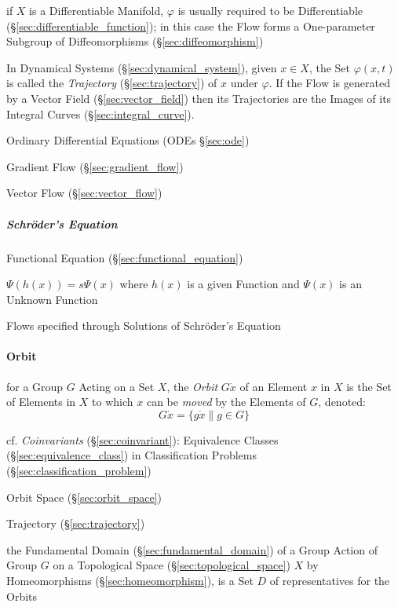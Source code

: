 if $X$ is a Differentiable Manifold, $\varphi$ is usually required to be
Differentiable (\S\ref{sec:differentiable_function}); in this case the Flow
forms a One-parameter Subgroup of Diffeomorphisms (\S\ref{sec:diffeomorphism})

In Dynamical Systems (\S\ref{sec:dynamical_system}), given $x \in X$, the Set
$\varphi(x,t)$ is called the \emph{Trajectory} (\S\ref{sec:trajectory}) of $x$
under $\varphi$. If the Flow is generated by a Vector Field
(\S\ref{sec:vector_field}) then its Trajectories are the Images of its Integral
Curves (\S\ref{sec:integral_curve}).

\fist Ordinary Differential Equations (ODEs \S\ref{sec:ode})

\fist Gradient Flow (\S\ref{sec:gradient_flow})

\fist Vector Flow (\S\ref{sec:vector_flow})



\subparagraph{Schr\"oder's Equation}\label{sec:schroders_equation}\hfill

Functional Equation (\S\ref{sec:functional_equation})

$\Psi(h(x)) = s\Psi(x)$ where $h(x)$ is a given Function and $\Psi(x)$ is
an Unknown Function

Flows specified through Solutions of Schr\"oder's Equation




\paragraph{Orbit}\label{sec:orbit}\hfill

for a Group $G$ Acting on a Set $X$, the \emph{Orbit} $G \dot x$ of an Element
$x$ in $X$ is the Set of Elements in $X$ to which $x$ can be \emph{moved} by
the Elements of $G$, denoted:
\[
  G \dot x = \{ g \dot x \| g \in G \}
\]

cf. \emph{Coinvariants} (\S\ref{sec:coinvariant}): Equivalence Classes
(\S\ref{sec:equivalence_class}) in Classification Problems
(\S\ref{sec:classification_problem})

\fist Orbit Space (\S\ref{sec:orbit_space})

\fist Trajectory (\S\ref{sec:trajectory})

the Fundamental Domain (\S\ref{sec:fundamental_domain}) of a Group Action of
Group $G$ on a Topological Space (\S\ref{sec:topological_space}) $X$ by
Homeomorphisms (\S\ref{sec:homeomorphism}), is a Set $D$ of representatives for
the Orbits



